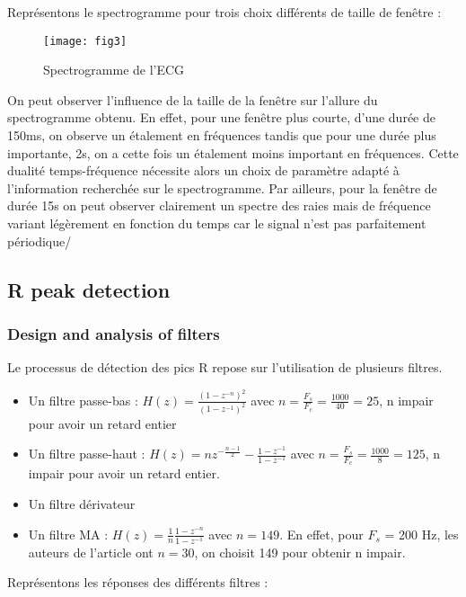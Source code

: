 \documentclass[12pt,a4paper,titlepage]{article}
\begin{document}
Représentons le spectrogramme pour trois choix différents de taille de fenêtre :

\begin{figure}[H]
    \caption{Spectrogramme de l'ECG}
    \texttt{[image: fig3]}
    \centering
\end{figure}

On peut observer l'influence de la taille de la fenêtre sur l'allure du spectrogramme obtenu.
En effet, pour une fenêtre plus courte, d'une durée de 150ms, on observe un étalement en fréquences tandis que
pour une durée plus importante, 2s, on a cette fois un étalement moins important en fréquences.
Cette dualité temps-fréquence nécessite alors un choix de paramètre adapté à l'information
recherchée sur le spectrogramme.
Par ailleurs, pour la fenêtre de durée 15s on peut observer clairement un spectre des raies mais de
fréquence variant légèrement en fonction du temps car le signal n'est pas parfaitement
périodique/

\subsection{R peak detection}

\subsubsection{Design and analysis of filters}

Le processus de détection des pics R repose sur l'utilisation de plusieurs filtres.

\begin{itemize}
    \item{Un filtre passe-bas : $H(z) = \frac{(1-z^{-n})^2}{(1-z^{-1})^2}$ avec
        $n = \frac{F_s}{F_c} = \frac{1000}{40} = 25$, n impair pour avoir un retard entier}
    \item{Un filtre passe-haut : $H(z) = nz^{-\frac{n-1}{2}} - \frac{1-z^{-1}}{1-z^{-1}}$
        avec $n = \frac{F_s}{F_c} =\frac{1000}{8} = 125$, n impair pour avoir un retard entier.}
    \item{Un filtre dérivateur}
    \item{Un filtre MA : $H(z) = \frac{1}{n} \frac{1-z^{-n}}{1-z^{-1}}$ avec 
            $n = 149$. En effet, pour $F_s$ = 200 Hz, les auteurs de l'article ont $n = 30$,
        on choisit 149 pour obtenir n impair.}
\end{itemize}

Représentons les réponses des différents filtres :
\end{document}
